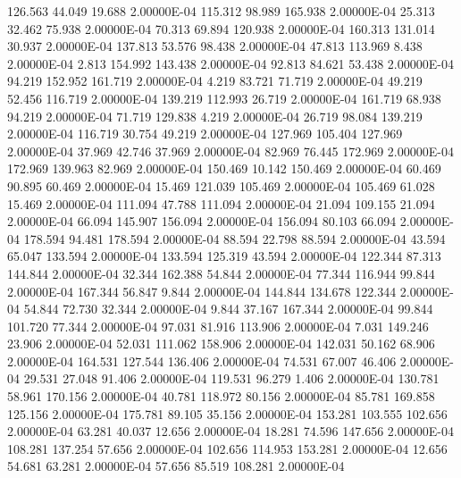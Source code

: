    126.563    44.049    19.688  2.00000E-04
   115.312    98.989   165.938  2.00000E-04
    25.313    32.462    75.938  2.00000E-04
    70.313    69.894   120.938  2.00000E-04
   160.313   131.014    30.937  2.00000E-04
   137.813    53.576    98.438  2.00000E-04
    47.813   113.969     8.438  2.00000E-04
     2.813   154.992   143.438  2.00000E-04
    92.813    84.621    53.438  2.00000E-04
    94.219   152.952   161.719  2.00000E-04
     4.219    83.721    71.719  2.00000E-04
    49.219    52.456   116.719  2.00000E-04
   139.219   112.993    26.719  2.00000E-04
   161.719    68.938    94.219  2.00000E-04
    71.719   129.838     4.219  2.00000E-04
    26.719    98.084   139.219  2.00000E-04
   116.719    30.754    49.219  2.00000E-04
   127.969   105.404   127.969  2.00000E-04
    37.969    42.746    37.969  2.00000E-04
    82.969    76.445   172.969  2.00000E-04
   172.969   139.963    82.969  2.00000E-04
   150.469    10.142   150.469  2.00000E-04
    60.469    90.895    60.469  2.00000E-04
    15.469   121.039   105.469  2.00000E-04
   105.469    61.028    15.469  2.00000E-04
   111.094    47.788   111.094  2.00000E-04
    21.094   109.155    21.094  2.00000E-04
    66.094   145.907   156.094  2.00000E-04
   156.094    80.103    66.094  2.00000E-04
   178.594    94.481   178.594  2.00000E-04
    88.594    22.798    88.594  2.00000E-04
    43.594    65.047   133.594  2.00000E-04
   133.594   125.319    43.594  2.00000E-04
   122.344    87.313   144.844  2.00000E-04
    32.344   162.388    54.844  2.00000E-04
    77.344   116.944    99.844  2.00000E-04
   167.344    56.847     9.844  2.00000E-04
   144.844   134.678   122.344  2.00000E-04
    54.844    72.730    32.344  2.00000E-04
     9.844    37.167   167.344  2.00000E-04
    99.844   101.720    77.344  2.00000E-04
    97.031    81.916   113.906  2.00000E-04
     7.031   149.246    23.906  2.00000E-04
    52.031   111.062   158.906  2.00000E-04
   142.031    50.162    68.906  2.00000E-04
   164.531   127.544   136.406  2.00000E-04
    74.531    67.007    46.406  2.00000E-04
    29.531    27.048    91.406  2.00000E-04
   119.531    96.279     1.406  2.00000E-04
   130.781    58.961   170.156  2.00000E-04
    40.781   118.972    80.156  2.00000E-04
    85.781   169.858   125.156  2.00000E-04
   175.781    89.105    35.156  2.00000E-04
   153.281   103.555   102.656  2.00000E-04
    63.281    40.037    12.656  2.00000E-04
    18.281    74.596   147.656  2.00000E-04
   108.281   137.254    57.656  2.00000E-04
   102.656   114.953   153.281  2.00000E-04
    12.656    54.681    63.281  2.00000E-04
    57.656    85.519   108.281  2.00000E-04
